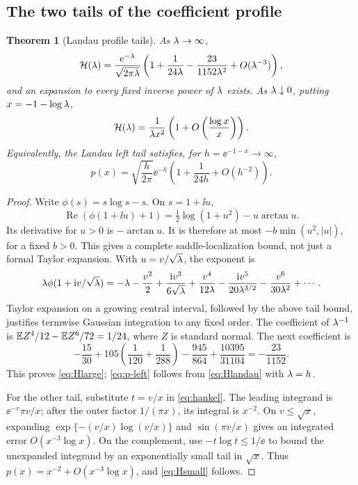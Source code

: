 \documentclass[11pt,a4paper]{article}
\numberwithin{equation}{section}
\newtheorem{theorem}{Theorem}[section]
\theoremstyle{definition}
\theoremstyle{remark}
\DeclareMathOperator{\Rea}{Re}
\newcommand{\HH}{\mathcal H}\newcommand{\RR}{\mathcal R}
\begin{document}
\subsection{The two tails of the coefficient profile}
\begin{theorem}[Landau profile tails]\label{thm:profile-tails}
As \(\lambda\to\infty\),
\begin{equation}\label{eq:Hlarge}
 \HH(\la)=\frac{\ee^{-\la}}{\sqrt{2\pi\la}}
 \left(1+\frac1{24\la}-\frac{23}{1152\la^2}
                        +O(\la^{-3})\right),
\end{equation}
and an expansion to every fixed inverse power of \(\lambda\) exists.
As \(\lambda\downarrow0\), putting \(x=-1-\log\lambda\),
\begin{equation}\label{eq:Hsmall}
 \HH(\la)=\frac1{\la x^2}
       \left(1+O\left(\frac{\log x}{x}\right)\right).
\end{equation}
Equivalently, the Landau left tail satisfies, for
\(h=\ee^{-1-x}\to\infty\),
\begin{equation}\label{eq:p-left}
 p(x)=\sqrt{\frac h{2\pi}}\ee^{-h}
          \left(1+\frac1{24h}+O(h^{-2})\right).
\end{equation}
\end{theorem}
\begin{proof}
Write \(\phi(s)=s\log s-s\). On \(s=1+\ii u\),
\[
 \Rea(\phi(1+\ii u)+1)
 =\tfrac12\log(1+u^2)-u\arctan u.
\]
Its derivative for \(u>0\) is \(-\arctan u\). It is therefore at most
\(-b\min(u^2,|u|)\), for a fixed \(b>0\). This gives a complete
saddle-localization bound, not just a formal Taylor expansion.
With \(u=v/\sqrt{\lambda}\), the exponent is
\[
 \lambda\phi(1+\mathrm i v/\sqrt{\lambda})
 =-\lambda-\frac{v^2}{2}
  +\frac{\mathrm i v^3}{6\sqrt{\lambda}}
  +\frac{v^4}{12\lambda}
  -\frac{\mathrm i v^5}{20\lambda^{3/2}}
  -\frac{v^6}{30\lambda^2}+\cdots.
\]
Taylor expansion on a growing central interval, followed by the above
tail bound, justifies termwise Gaussian integration to any fixed order.
The coefficient of \(\lambda^{-1}\) is
\(\mathbb E Z^4/12-\mathbb E Z^6/72=1/24\), where \(Z\) is standard normal.
The next coefficient is
\[
 -\frac{15}{30}
 +105\left(\frac1{120}+\frac1{288}\right)
 -\frac{945}{864}+\frac{10395}{31104}
 =-\frac{23}{1152}.
\]
This proves \eqref{eq:Hlarge}; \eqref{eq:p-left} follows from
\eqref{eq:Hlandau} with \(\lambda=h\).

For the other tail, substitute \(t=v/x\) in \eqref{eq:hankel}.
The leading integrand is \(\ee^{-v}\pi v/x\); after the outer factor
\(1/(\pi x)\), its integral is \(x^{-2}\).
On \(v\le\sqrt x\), expanding
\(\exp\{-(v/x)\log(v/x)\}\) and \(\sin(\pi v/x)\) gives an integrated
error \(O(x^{-3}\log x)\). On the complement, use
\(-t\log t\le1/\ee\) to bound the unexpanded integrand by an
exponentially small tail in \(\sqrt x\). Thus
\(p(x)=x^{-2}+O(x^{-3}\log x)\), and \eqref{eq:Hsmall} follows.
\end{proof}
\end{document}
